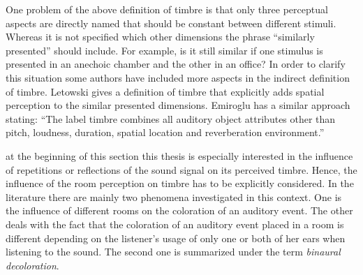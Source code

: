One problem of the above definition of timbre is that only
three perceptual aspects are directly named that should be constant between
different stimuli. Whereas it is not specified which
other dimensions the phrase ``similarly presented'' should include.
For example, is it still similar
if one stimulus is presented in an anechoic chamber and the other in an
office?
In order to clarify this situation some authors have included more aspects in
the indirect definition of timbre.
Letowski\autocite{Letowski1989} gives a
definition of timbre that explicitly adds spatial perception to the similar
presented dimensions. 
Emiroglu\autocite[][p. 89]{Emiroglu2007} has a similar approach stating:
``The label timbre combines all auditory object attributes other
than pitch, loudness, duration, spatial location and reverberation
environment.''


 at the beginning of this section this thesis is especially interested
in the influence of repetitions or reflections of the sound signal on its
perceived timbre. Hence, the influence of the room perception on timbre has to
be explicitly considered. In the literature there are mainly two phenomena
investigated in this context. One is the influence of different rooms on the
coloration of an auditory event. The other deals with the
fact that the coloration of an auditory event placed in a room is different
depending on the listener's usage of only one or both of her ears when listening
to the sound. The second one is summarized under the term
\emph{binaural decoloration}.\autocite[It was first reported by][]{Koenig1950}


